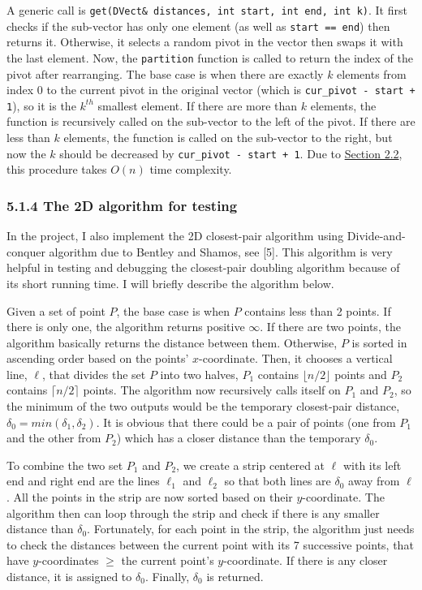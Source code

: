 \documentclass[12pt,english,]{article}
\newcommand{\code}[1]{\colorbox{light-gray}{\texttt{#1}}}
\begin{document}
A generic call is
\code{get(DVect\& distances, int start, int end, int k)}. It first
checks if the sub-vector has only one element (as well as
\code{start == end}) then returns it. Otherwise, it selects a random
pivot in the vector then swaps it with the last element. Now, the
\code{partition} function is called to return the index of the pivot
after rearranging. The base case is when there are exactly \(k\)
elements from index 0 to the current pivot in the original vector (which
is \code{cur\_pivot - start + 1}), so it is the \(k^{th}\) smallest
element. If there are more than \(k\) elements, the function is
recursively called on the sub-vector to the left of the pivot. If there
are less than \(k\) elements, the function is called on the sub-vector
to the right, but now the \(k\) should be decreased by
\code{cur\_pivot - start + 1}. Due to
\protect\hyperlink{section2.2}{Section 2.2}, this procedure takes
\(O(n)\) time complexity.

\hypertarget{the-2d-algorithm-for-testing}{%
\subsubsection{5.1.4 The 2D algorithm for
testing}\label{the-2d-algorithm-for-testing}}

In the project, I also implement the 2D closest-pair algorithm using
Divide-and-conquer algorithm due to Bentley and Shamos, see {[}5{]}.
This algorithm is very helpful in testing and debugging the closest-pair
doubling algorithm because of its short running time. I will briefly
describe the algorithm below.

Given a set of point \(P\), the base case is when \(P\) contains less
than 2 points. If there is only one, the algorithm returns positive
\(\infty\). If there are two points, the algorithm basically returns the
distance between them. Otherwise, \(P\) is sorted in ascending order
based on the points' \(x\)-coordinate. Then, it chooses a vertical line,
\(\ell\), that divides the set \(P\) into two halves, \(P_1\) contains
\(\lfloor n/2 \rfloor\) points and \(P_2\) contains
\(\lceil n/2 \rceil\) points. The algorithm now recursively calls itself
on \(P_1\) and \(P_2\), so the minimum of the two outputs would be the
temporary closest-pair distance, \(\delta_0 = min(\delta_1, \delta_2)\).
It is obvious that there could be a pair of points (one from \(P_1\) and
the other from \(P_2\)) which has a closer distance than the temporary
\(\delta_0\).

To combine the two set \(P_1\) and \(P_2\), we create a strip centered
at \(\ell\) with its left end and right end are the lines \(\ell_1\) and
\(\ell_2\) so that both lines are \(\delta_0\) away from \(\ell\). All
the points in the strip are now sorted based on their \(y\)-coordinate.
The algorithm then can loop through the strip and check if there is any
smaller distance than \(\delta_0\). Fortunately, for each point in the
strip, the algorithm just needs to check the distances between the
current point with its 7 successive points, that have \(y\)-coordinates
\(\geq\) the current point's \(y\)-coordinate. If there is any closer
distance, it is assigned to \(\delta_0\). Finally, \(\delta_0\) is
returned.
\end{document}
